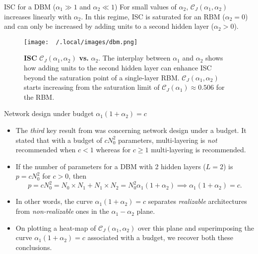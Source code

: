 \documentclass[8pt]{beamer}
\begin{document}
\begin{frame}[label={sec:orgfb9aed2}]{ISC for a DBM (\(\alpha_1 \gg 1\) and \(\alpha_{2} \ll 1\))}
For small values of \(\alpha_{2}\), \(\mathcal{C}_{J} (\alpha_{1}, \alpha_{2})\) increases linearly with \(\alpha_{2}\). In this regime, ISC is saturated for an RBM (\(\alpha_{2} = 0\)) and can only be increased by adding units to a second hidden layer (\(\alpha_{2} > 0\)).

\begin{figure}[htbp]
  \centering
  \texttt{[image: ~/.local/images/dbm.png]}
  \caption{\textbf{ISC} \(\mathcal{C}_{J} (\alpha_{1}, \alpha_{2})\) \textbf{vs.} \(\alpha_{2}\). The interplay between \(\alpha_{1}\) and \(\alpha_{2}\) shows how adding units to the second hidden layer can enhance ISC beyond the saturation point of a single-layer RBM. \(\mathcal{C}_{J} (\alpha_{1}, \alpha_{2})\) starts increasing from the saturation limit of \(\mathcal{C}_{J} (\alpha_{1}) \approx 0.506 \) for the RBM.}
  \label{fig:sub2}
\end{figure}
\end{frame}


\begin{frame}[label={sec:org4b04120}]{Network design under budget \(\alpha_1 (1 + \alpha_2) = c\)}
\begin{itemize}
\item The \emph{third} key result from \cite{bansal2018using} was concerning network design under a budget. It stated that with a budget of \(c N_{0}^{2}\) parameters, multi-layering is \emph{not} recommended when \(c < 1\) whereas for \(c \geq 1\) multi-layering is recommended.
\linebreak
\item If the number of parameters for a DBM with 2 hidden layers (\(L=2\)) is \(p = c N_{0}^2\) for \(c > 0\), then
\[
  p = c N_0^{2} = N_{0} \times N_{1} + N_{1} \times N_{2} = N_{0}^{2} \alpha_{1} (1 + \alpha_{2}) \implies \alpha_1 (1 + \alpha_2) = c.
  \]
\linebreak
\item In other words, the curve \(\alpha_{1} (1 + \alpha_{2}) = c\) separates \emph{realizable} architectures from \emph{non-realizable} ones in the \(\alpha_{1} - \alpha_{2}\) plane.
\linebreak
\item On plotting a heat-map of \(\mathcal{C}_{J} (\alpha_{1}, \alpha_{2})\) over this plane and superimposing the curve \(\alpha_{1} (1 + \alpha_{2}) = c\) associated with a budget, we recover both these conclusions.
\end{itemize}
\end{frame}
\end{document}

